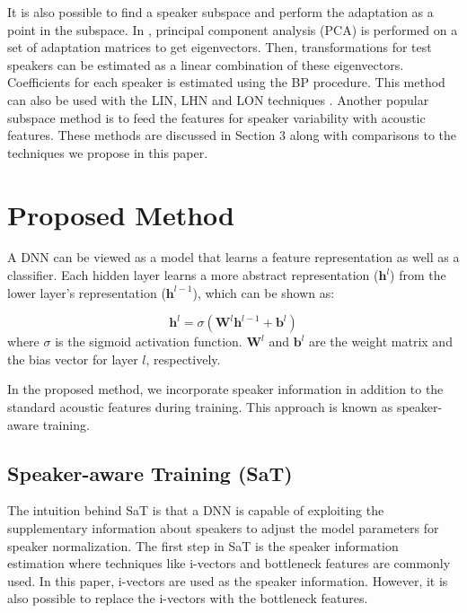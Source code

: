 \documentclass[a4paper]{article}
\begin{document}
 
 It is also possible to find a speaker subspace and perform the adaptation as a point in the subspace. In \cite{PCA}, principal component analysis (PCA) is performed on a set of adaptation matrices to get eigenvectors. Then, transformations for test speakers can be estimated as a linear combination of these eigenvectors. Coefficients for each speaker is estimated using the BP procedure. This method can also be used with the LIN, LHN and LON techniques \cite{LIBO}.  Another popular subspace method is to feed the features for speaker variability with acoustic features. These methods are discussed in Section 3 along with comparisons to the techniques we propose in this paper.
 
 
 \section{Proposed Method}
 
   A DNN can be viewed as a model that learns a feature representation as well as a classifier. Each hidden layer learns a more abstract representation ($\mathbf{h}^l$) from the lower layer's representation ($\mathbf{h}^{l-1}$), which can be shown as:
  
  \begin{equation}
  \label{standard}
  \mathbf{h}^l = \sigma (\mathbf{W}^l \mathbf{h}^{l-1}+ \mathbf{b}^l )
  \end{equation} where $\sigma$ is the sigmoid activation function. $\mathbf{W}^l$ and $\mathbf{b}^l$ are the weight matrix and the bias vector for layer $l$, respectively. 
  
   
   In the proposed method, we incorporate speaker information in addition to the standard acoustic features during training. This approach is known as speaker-aware training. 
  
   \subsection{Speaker-aware Training (SaT)}
   
  The intuition behind SaT is that a DNN is capable of exploiting the supplementary information about speakers to adjust the model parameters for speaker normalization. The first step in SaT is the speaker information estimation where techniques like i-vectors \cite{IVECT}\cite{IVECT1}\cite{IVECT4} and bottleneck features \cite{HENGUAN} are commonly used. In this paper, i-vectors are used as the speaker information. However, it is also possible to replace the i-vectors with the bottleneck features. 
  
\end{document}
